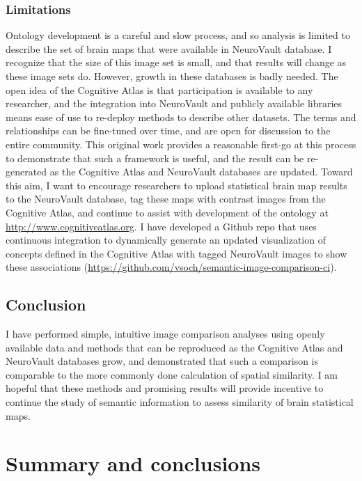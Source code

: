\documentclass{report}
\begin{document}
\subsection{Limitations}

Ontology development is a careful and slow process, and so analysis is
limited to describe the set of brain maps that were available in
NeuroVault database. I recognize that the size of this image set is
small, and that results will change as these image sets do. However,
growth in these databases is badly needed. The open idea of the
Cognitive Atlas is that participation is available to any researcher,
and the integration into NeuroVault and publicly available libraries
means ease of use to re-deploy methods to describe other datasets. The
terms and relationships can be fine-tuned over time, and are open for
discussion to the entire community. This original work provides a
reasonable first-go at this process to demonstrate that such a framework
is useful, and the result can be re-generated as the Cognitive Atlas and
NeuroVault databases are updated. Toward this aim, I want to encourage
researchers to upload statistical brain map results to the NeuroVault
database, tag these maps with contrast images from the Cognitive Atlas,
and continue to assist with development of the ontology at
\href{http://www.cognitiveatlas.org}{http://www.cognitiveatlas.org}.
I have developed a Github repo that uses continuous integration to
dynamically generate an updated visualization of concepts defined in the
Cognitive Atlas with tagged NeuroVault images to show these associations
(\href{https://github.com/vsoch/semantic-image-comparison-ci}{https://github.com/vsoch/semantic-image-comparison-ci}).

\section{Conclusion}

I have performed simple, intuitive image comparison analyses using
openly available data and methods that can be reproduced as the
Cognitive Atlas and NeuroVault databases grow, and demonstrated that
such a comparison is comparable to the more commonly done calculation of
spatial similarity. I am hopeful that these methods and promising
results will provide incentive to continue the study of semantic
information to assess similarity of brain statistical maps.



\chapter{Summary and conclusions}
\end{document}

